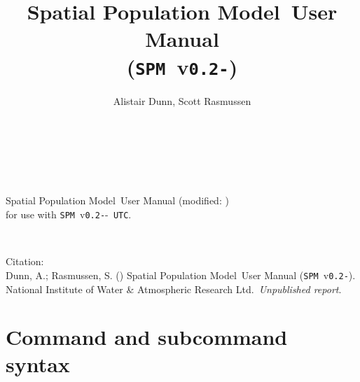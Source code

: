 \documentclass[11pt,twoside,pdftex]{article}
\renewcommand{\headrulewidth}{0pt}
\begin{document}

\newcommand{\DocYear}{\SourceControlYearDoc}
\newcommand{\DocMonth}{\SourceControlMonthDoc}
\newcommand{\DocDate}{\SourceControlMonthDoc\ \SourceControlYearDoc}
\newcommand{\DocVer}{\SourceControlDateDoc}


\newcommand{\VER}{\texttt{0.2-\SourceControlDateSPM}}
\newcommand{\SPM}{\texttt{SPM}}
\newcommand{\SPMName}{Spatial Population Model}
\newcommand{\authors}{\href{mailto:"Alistair Dunn"<a.dunn@niwa.co.nz>?subject=SPM:}{authors}}
\newcommand{\Organisation}{National Institute of Water \& Atmospheric Research Ltd.}
\newcommand{\ManualRef}{Dunn, A.; Rasmussen, S. (\DocYear) \SPMName\ User Manual (\SPM\ v\VER). \Organisation\ \emph{Unpublished report}.}
\title{\SPMName\ User Manual \\(\SPM\ v\VER)}
\author{Alistair Dunn, Scott Rasmussen}
\date{\DocDate}


\maketitle
\thispagestyle{empty}
~\vfill
\begin{center}
\SPMName\ User Manual (modified: \DocVer) \\
for use with \SPM\ v\VER-\texttt{\SourceControlTimeSPM\ UTC}.
\end{center}

\cleardoublepage{}
\fancyfoot[C]{\thepage}
~\vfill
\begin{center}
{Citation:\\ \ManualRef}
\end{center}

\cleardoublepage{}
\tableofcontents{}

\sloppy
\cleardoublepage{}
\renewcommand{\headrulewidth}{0.2pt}
\fancyhead[LE]{\slshape \nouppercase \rightmark}
\fancyhead[RO]{\slshape \nouppercase \leftmark}


\cleardoublepage{}


\cleardoublepage{}


\cleardoublepage{}


\cleardoublepage{}


\cleardoublepage{}
\section{Command and subcommand syntax\label{sec:syntax}}




\end{document}
